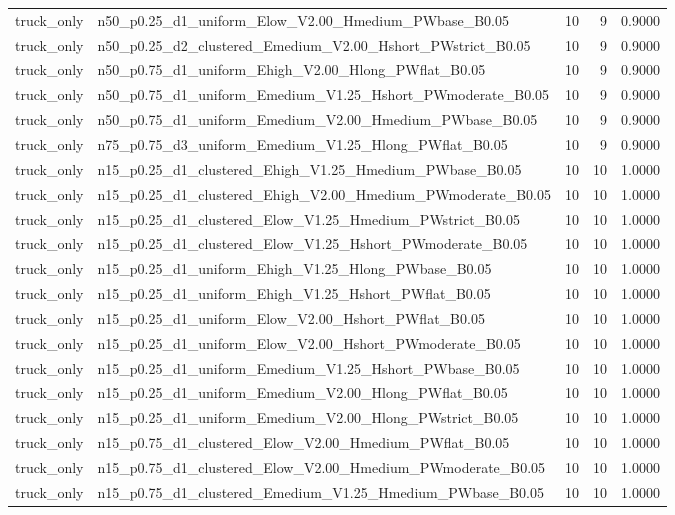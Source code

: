 \begin{tabular}{llrrr}
truck_only & n50_p0.25_d1_uniform_Elow_V2.00_Hmedium_PWbase_B0.05 & 10 & 9 & 0.9000 \\
truck_only & n50_p0.25_d2_clustered_Emedium_V2.00_Hshort_PWstrict_B0.05 & 10 & 9 & 0.9000 \\
truck_only & n50_p0.75_d1_uniform_Ehigh_V2.00_Hlong_PWflat_B0.05 & 10 & 9 & 0.9000 \\
truck_only & n50_p0.75_d1_uniform_Emedium_V1.25_Hshort_PWmoderate_B0.05 & 10 & 9 & 0.9000 \\
truck_only & n50_p0.75_d1_uniform_Emedium_V2.00_Hmedium_PWbase_B0.05 & 10 & 9 & 0.9000 \\
truck_only & n75_p0.75_d3_uniform_Emedium_V1.25_Hlong_PWflat_B0.05 & 10 & 9 & 0.9000 \\
truck_only & n15_p0.25_d1_clustered_Ehigh_V1.25_Hmedium_PWbase_B0.05 & 10 & 10 & 1.0000 \\
truck_only & n15_p0.25_d1_clustered_Ehigh_V2.00_Hmedium_PWmoderate_B0.05 & 10 & 10 & 1.0000 \\
truck_only & n15_p0.25_d1_clustered_Elow_V1.25_Hmedium_PWstrict_B0.05 & 10 & 10 & 1.0000 \\
truck_only & n15_p0.25_d1_clustered_Elow_V1.25_Hshort_PWmoderate_B0.05 & 10 & 10 & 1.0000 \\
truck_only & n15_p0.25_d1_uniform_Ehigh_V1.25_Hlong_PWbase_B0.05 & 10 & 10 & 1.0000 \\
truck_only & n15_p0.25_d1_uniform_Ehigh_V1.25_Hshort_PWflat_B0.05 & 10 & 10 & 1.0000 \\
truck_only & n15_p0.25_d1_uniform_Elow_V2.00_Hshort_PWflat_B0.05 & 10 & 10 & 1.0000 \\
truck_only & n15_p0.25_d1_uniform_Elow_V2.00_Hshort_PWmoderate_B0.05 & 10 & 10 & 1.0000 \\
truck_only & n15_p0.25_d1_uniform_Emedium_V1.25_Hshort_PWbase_B0.05 & 10 & 10 & 1.0000 \\
truck_only & n15_p0.25_d1_uniform_Emedium_V2.00_Hlong_PWflat_B0.05 & 10 & 10 & 1.0000 \\
truck_only & n15_p0.25_d1_uniform_Emedium_V2.00_Hlong_PWstrict_B0.05 & 10 & 10 & 1.0000 \\
truck_only & n15_p0.75_d1_clustered_Elow_V2.00_Hmedium_PWflat_B0.05 & 10 & 10 & 1.0000 \\
truck_only & n15_p0.75_d1_clustered_Elow_V2.00_Hmedium_PWmoderate_B0.05 & 10 & 10 & 1.0000 \\
truck_only & n15_p0.75_d1_clustered_Emedium_V1.25_Hmedium_PWbase_B0.05 & 10 & 10 & 1.0000 \\

\end{tabular}
